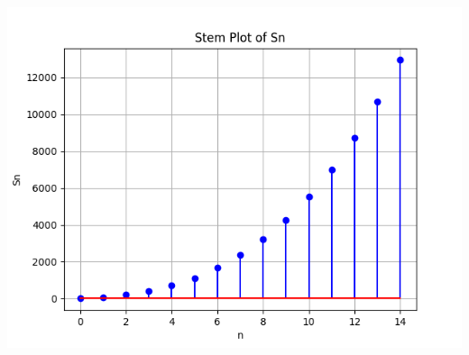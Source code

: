 \documentclass[journal,12pt,twocolumn]{IEEEtran}
\theoremstyle{remark}
\begin{document}
        \includegraphics[width=\columnwidth]{figs/plot.png}

        
            
           
             
             
             
        

        













\renewcommand{\thefigure}{\theenumi}
\renewcommand{\thetable}{\theenumi}
\end{document}
